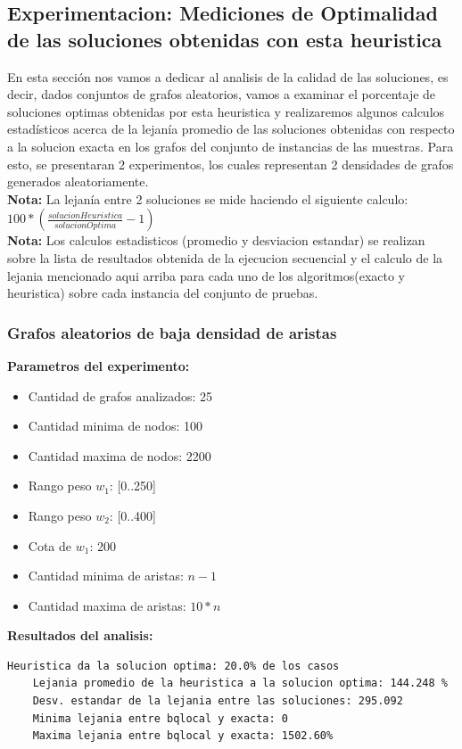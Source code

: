 \subsection{Experimentacion: Mediciones de Optimalidad de las soluciones obtenidas con esta heuristica}
En esta secci\'on nos vamos a dedicar al analisis de la calidad de las soluciones, es decir, dados conjuntos de grafos aleatorios, vamos a examinar el porcentaje de soluciones optimas obtenidas por esta heuristica y realizaremos algunos calculos estad\'isticos acerca de la lejan\'ia promedio de las soluciones obtenidas con respecto a la solucion exacta en los grafos del conjunto de instancias de las muestras. Para esto, se presentaran 2 experimentos, los cuales representan 2 densidades de grafos generados aleatoriamente.\\
\textbf{Nota: }La lejan\'ia entre 2 soluciones se mide haciendo el siguiente calculo: 
$ 100 *(\frac{solucionHeuristica}{solucionOptima} - 1)  $\\
\textbf{Nota: } Los calculos estadisticos (promedio y desviacion estandar) se realizan sobre la lista de resultados obtenida de la ejecucion secuencial y el calculo de la lejania mencionado aqui arriba para cada uno de los algoritmos(exacto y heuristica) sobre cada instancia del conjunto de pruebas.

\subsubsection{Grafos aleatorios de baja densidad de aristas}
\textbf{Parametros del experimento:}
\begin{itemize}
	\item Cantidad de grafos analizados: 25
	\item Cantidad minima de nodos: 100
	\item Cantidad maxima de nodos: 2200
	\item Rango peso $w_1$: [0..250]
	\item Rango peso $w_2$: [0..400]
	\item Cota de $w_1$: 200
	\item Cantidad minima de aristas: $n-1$
	\item Cantidad maxima de aristas: $10*n$
\end{itemize}

\textbf{Resultados del analisis:}
\begin{lstlisting}[frame=single]
	Heuristica da la solucion optima: 20.0% de los casos
	Lejania promedio de la heuristica a la solucion optima: 144.248 %
	Desv. estandar de la lejania entre las soluciones: 295.092
	Minima lejania entre bqlocal y exacta: 0
	Maxima lejania entre bqlocal y exacta: 1502.60%
\end{lstlisting}

